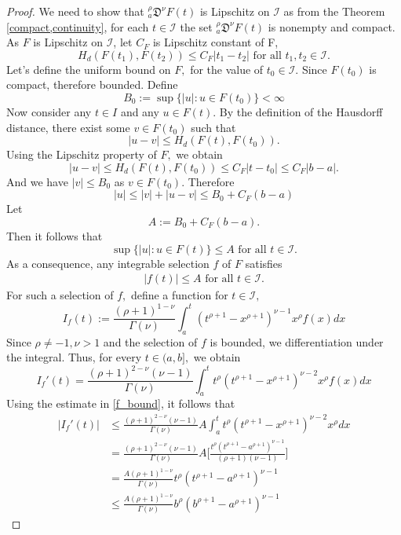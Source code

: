 \documentclass{amsproc}
\theoremstyle{definition}
\theoremstyle{remark}
\numberwithin{equation}{section}
\begin{document}
\begin{proof}
   We need to show that $_a^\rho\mathfrak{D}^\nu F(t)$ is  Lipschitz on $\mathcal{I}$ as from the Theorem \ref{compact,continuity}, for each $t\in \mathcal{I}$ the set $_a^\rho\mathfrak{D}^\nu F(t)$ is nonempty and compact. As $F$ is Lipschitz on $\mathcal{I}$, let $C_F$ is Lipschitz constant of F, 
   \[ H_d(F(t_1),F(t_2))\le C_F |t_1-t_2| \text{ for all } t_1,t_2 \in \mathcal{I}.\]  
   Let's define the uniform bound on $F,$ for the value of $t_0 \in \mathcal{I}.$ Since $F(t_0)$ is compact, therefore bounded. Define  
\[ B_0:= \sup \{|u| : u \in F(t_0)\} < \infty \] 
Now consider any $t\in I$ and any $u \in F(t).$ By the definition of the Hausdorff distance, there exist some $ v \in F(t_0)$ such that 
\[ |u-v|\le H_d(F(t),F(t_0)).\]
Using the Lipschitz property of $F,$ we obtain 
\[ |u-v|\le H_d(F(t),F(t_0)) \le C_F|t-t_0|\le C_F|b-a|.\]
And we have $|v|\le B_0$ as $v\in F(t_0).$ Therefore
\[ |u| \le |v|+|u-v|\le B_0+C_F(b-a) \]
Let \[ A:= B_0+C_F(b-a). \]
Then it follows that
\[ \sup \{|u|:u \in F(t)\}\le A \text{ for all } t\in \mathcal{I}.\]
As a consequence, any integrable selection $f$ of $F$ satisfies
\begin{equation} \label{f_bound}
    \begin{aligned}
 |f(t)| \le A  \text{ for all } t \in \mathcal{I}. 
  \end{aligned}
\end{equation}
 For such a selection of $f,$ define a function for $t\in \mathcal{I},$ 
 \[ I_f(t):= \frac{(\rho+1)^{1-\nu}}{\Gamma(\nu)}\int_a^t(t^{\rho+1}-x^{\rho+1})^{\nu-1}x^{\rho}f(x)dx \]
 Since $\rho \neq -1, \nu>1$ and the selection of $f$ is bounded, we differentiation under the integral. Thus, for every $t \in (a,b],$ we obtain 
 \[I_f'(t)=\frac{(\rho+1)^{2-\nu}(\nu-1)}{\Gamma(\nu)}\int_a^t t^\rho (t^{\rho+1}-x^{\rho+1})^{\nu-2}x^{\rho}f(x)dx  \]
 Using the estimate in \ref{f_bound}, it follows that
 \begin{equation*}
     \begin{aligned}
         |I_f'(t)| &\le \frac{(\rho+1)^{2-\nu}(\nu-1)}{\Gamma(\nu)}A\int_a^t t^\rho (t^{\rho+1}-x^{\rho+1})^{\nu-2}x^{\rho}dx\\ &= \frac{(\rho+1)^{2-\nu}(\nu-1)}{\Gamma(\nu)}A\bigg[\frac{t^\rho (t^{\rho+1}-a^{\rho+1})^{\nu-1}}{(\rho+1)(\nu-1)} \bigg] \\ 
         &= \frac{A(\rho+1)^{1-\nu}}{\Gamma(\nu)}t^\rho (t^{\rho+1}-a^{\rho+1})^{\nu-1}\\
         &\le \frac{A(\rho+1)^{1-\nu}}{\Gamma(\nu)} b^\rho (b^{\rho+1}-a^{\rho+1})^{\nu-1}

\end{aligned}
\end{equation*}
\end{proof}
\end{document}
